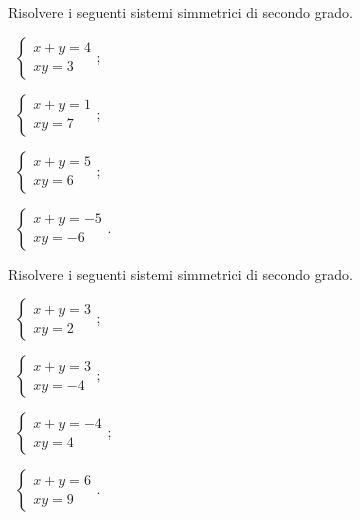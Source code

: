 \begin{esercizio}[\Ast]
 \label{ese:6.14}
Risolvere i seguenti sistemi simmetrici di secondo grado.
\begin{multicols}{2}
 \begin{enumeratea}
 \item~$\left\{\begin{array}{l}x+y=4\\{xy}=3\end{array}\right.$;
 \item~$\left\{\begin{array}{l}x+y=1\\{xy}=7 \end{array}\right.$;
 \item~$\left\{\begin{array}{l}x+y=5\\{xy}=6 \end{array}\right.$;
 \item~$\left\{\begin{array}{l}x+y=-5\\{xy}=-6 \end{array}\right.$.
 \end{enumeratea}
 \end{multicols}
\end{esercizio}

\begin{esercizio}[\Ast]
 \label{ese:6.15}
Risolvere i seguenti sistemi simmetrici di secondo grado.
\begin{multicols}{2}
 \begin{enumeratea}
 \item~$\left\{\begin{array}{l}x+y=3\\{xy}=2 \end{array}\right.$;
 \item~$\left\{\begin{array}{l}x+y=3\\{xy}=-4\end{array}\right.$;
 \item~$\left\{\begin{array}{l}x+y=-4\\{xy}=4 \end{array}\right.$;
 \item~$\left\{\begin{array}{l}x+y=6\\{xy}=9 \end{array}\right.$.
 \end{enumeratea}
 \end{multicols}
\end{esercizio}

